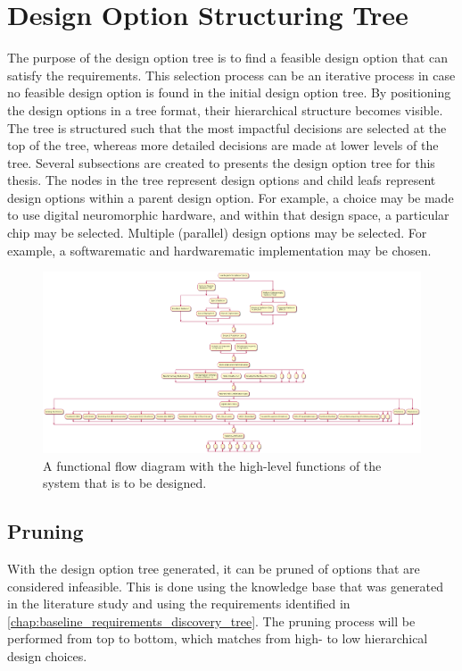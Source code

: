 \chapter{Design Option Structuring Tree}\label{chap:baseline_dot}
The purpose of the design option tree is to find a feasible design option that can satisfy the requirements. This selection process can be an iterative process in case no feasible design option is found in the initial design option tree. By positioning the design options in a tree format, their hierarchical structure becomes visible. The tree is structured such that the most impactful decisions are selected at the top of the tree, whereas more detailed decisions are made at lower levels of the tree. Several subsections are created to   presents the design option tree for this thesis. The nodes in the tree represent design options and child leafs represent design options within a parent design option. For example, a choice may be made to use digital neuromorphic hardware, and within that design space, a particular chip may be selected. Multiple (parallel) design options may be selected. For example, a softwarematic and hardwarematic implementation may be chosen.
\begin{figure}[H]
    \centering
    \includegraphics[width=0.6\linewidth]{latex/Images/dot.png}
    \caption{A functional flow diagram with the high-level functions of the system that is to be designed.}
    \label{fig:baseline_dot}
\end{figure}

\section{Pruning}\label{sec:baseline_pruning}
With the design option tree generated, it can be pruned of options that are considered infeasible. This is done using the knowledge base that was generated in the literature study and using the requirements identified in \cref{chap:baseline_requirements_discovery_tree}.  The pruning process will be performed from top to bottom, which matches from high- to low hierarchical design choices.

